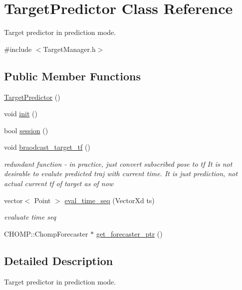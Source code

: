 \hypertarget{class_target_predictor}{}\section{Target\+Predictor Class Reference}
\label{class_target_predictor}


Target predictor in prediction mode.  




{\ttfamily \#include $<$Target\+Manager.\+h$>$}

\subsection*{Public Member Functions}
\begin{DoxyCompactItemize}
\item 
\hyperlink{class_target_predictor_ad03a40479459db38b5b7117b96e89522}{Target\+Predictor} ()
\item 
void \hyperlink{class_target_predictor_a3db2b852f165a35a2e709d7e2f486dde}{init} ()
\item 
bool \hyperlink{class_target_predictor_a4468a320a84ad7abb6ed9a6e388acf1f}{session} ()
\item 
void \hyperlink{class_target_predictor_a8c032da6eff34ce4c596c62ac8e3a804}{braodcast\+\_\+target\+\_\+tf} ()
\begin{DoxyCompactList}\small\item\em redundant function -\/ in practice, just convert subscribed pose to tf It is not desirable to evalute predicted traj with current time. It is just prediction, not actual current tf of target as of now \end{DoxyCompactList}\item 
vector$<$ Point $>$ \hyperlink{class_target_predictor_ac136ae7ec5c7745065f0f5662a909beb}{eval\+\_\+time\+\_\+seq} (Vector\+Xd ts)
\begin{DoxyCompactList}\small\item\em evaluate time seq \end{DoxyCompactList}\item 
C\+H\+O\+M\+P\+::\+Chomp\+Forecaster $\ast$ \hyperlink{class_target_predictor_a56fbf63019d226246a84700c7b5f5b38}{get\+\_\+forecaster\+\_\+ptr} ()
\end{DoxyCompactItemize}


\subsection{Detailed Description}
Target predictor in prediction mode. 

